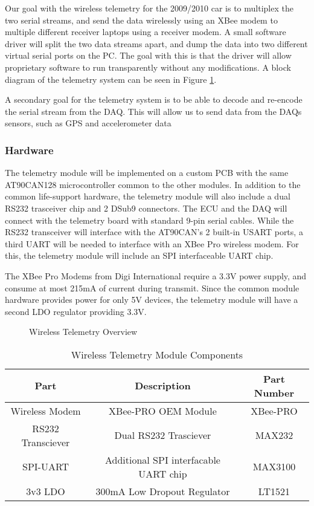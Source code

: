 Our goal with the wireless telemetry for the 2009/2010 car is to multiplex the two serial streams, and send the data wirelessly using an XBee modem to multiple different receiver laptops using a receiver modem. A small software driver will split the two data streams apart, and dump the data into two different virtual serial ports on the PC. The goal with this is that the driver will allow proprietary software to run transparently without any modifications. A block diagram of the telemetry system can be seen in Figure \ref{fig:Wireless-Telemetry-Overview}.

A secondary goal for the telemetry system is to be able to decode and re-encode the serial stream from the DAQ. This will allow us to send data from the DAQs sensors, such as GPS and accelerometer data 

\subsubsection{Hardware}
The telemetry module will be implemented on a custom PCB with the same AT90CAN128 microcontroller common to the other modules. In addition to the common life-support hardware, the telemetry module will also include a dual RS232 trasceiver chip and 2 DSub9 connectors. The ECU and the DAQ will connect with the telemetry board with standard 9-pin serial cables. While the RS232 transceiver will interface with the AT90CAN's 2 built-in USART ports, a third UART will be needed to interface with an XBee Pro wireless modem. For this, the telemetry module will include an SPI interfaceable UART chip.

The XBee Pro Modems from Digi International require a 3.3V power supply, and consume at most 215mA of current during transmit. Since the common module hardware provides power for only 5V devices, the telemetry module will have a second LDO regulator providing 3.3V.

  \begin{figure}[H]
    \begin{centering}
      
    \end{centering}

    \caption{Wireless Telemetry Overview\label{fig:Wireless-Telemetry-Overview}}
  \end{figure}

  \begin{table}[H]
    \caption{Wireless Telemetry Module
Components\label{tab:Wireless-Telemetry-Module}}
    \begin{centering}
      \begin{tabular}{|c|c|c|}
	\hline 
	Part & Description & Part Number\tabularnewline
	\hline
	\hline
	Wireless Modem & XBee-PRO OEM Module & XBee-PRO\tabularnewline
	\hline 
	RS232 Transciever & Dual RS232 Trasciever & MAX232\tabularnewline
	\hline 
	SPI-UART & Additional SPI interfacable UART chip &
MAX3100\tabularnewline
	\hline 
	3v3 LDO & 300mA Low Dropout Regulator & LT1521\tabularnewline
	\hline
      \end{tabular}
    \end{centering}
  \end{table}

